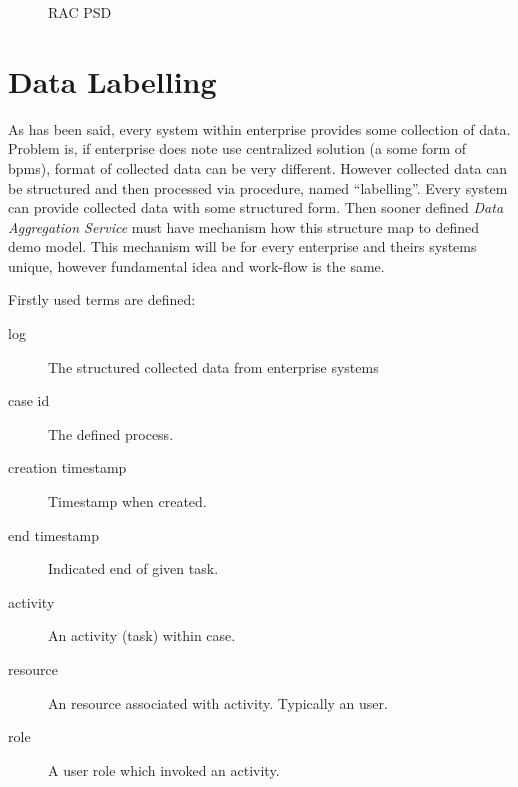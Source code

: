 \begin{figure}[ht!]
 \centering
 \qquad
 \caption{RAC PSD}%
 \label{fig:rac-psd}%
\end{figure}
\newpage

\section{Data Labelling}
As has been said, every system within enterprise provides some collection of data. Problem is, if enterprise does note use centralized solution (a some form of \gls{bpms}), format of collected data can be very different. 
However collected data can be structured and then processed via procedure, named ``labelling''. Every system can provide collected data with some structured form. Then sooner defined \textit{Data Aggregation Service} must have mechanism how this structure map to defined \gls{demo} model. This mechanism will be for every enterprise and theirs systems unique, however fundamental idea and work-flow is the same.

Firstly used terms are defined:
\begin{description}
\item[log] The structured collected data from enterprise systems
\item[case id] The defined process.
\item[creation timestamp] Timestamp when created.
\item[end timestamp] Indicated end of given task.
\item[activity] An activity (task) within case.
\item[resource] An resource associated with activity. Typically an user.
\item[role] A user role which invoked an activity.
\end{description}


